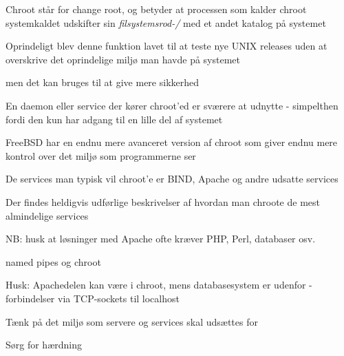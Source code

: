 
\begin{list1}
  \item Chroot står for change root, og betyder at processen som
  kalder chroot systemkaldet udskifter sin \emph{filsystemsrod-/} med
  et andet katalog på systemet
\item Oprindeligt blev denne funktion lavet til at teste nye UNIX
  releases uden at overskrive det oprindelige miljø man havde på
  systemet
\item men det kan bruges til at give mere sikkerhed
\item En daemon eller service der kører chroot'ed er sværere at
  udnytte - simpelthen fordi den kun har adgang til en lille del af
  systemet
\item FreeBSD har en endnu mere avanceret version af chroot som giver
  endnu mere kontrol over det miljø som programmerne ser
\end{list1}


\begin{list1}
\item De services man typisk vil chroot'e er BIND, Apache og andre
  udsatte services
\item Der findes heldigvis udførlige beskrivelser af hvordan man
chroote de mest almindelige services 
\item NB: husk at løsninger med Apache ofte kræver PHP, Perl,
  databaser osv. 
\end{list1}


\centerline{named pipes og chroot}

\begin{list2}
\item Husk: Apachedelen kan være i chroot, mens databasesystem er udenfor -
forbindelser via TCP-sockets til localhost
\end{list2}



\begin{list1}
\item Tænk på det miljø som servere og services skal udsættes for
\item Sørg for hærdning
\end{list1}

